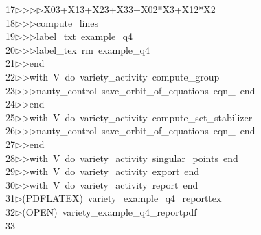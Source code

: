 \begin{tabbing}
17\>$\triangleright$\>$\triangleright$\>$\triangleright$\>$\triangleright$\>X03+X13+X23+X33+X02*X3+X12*X2\ \\[0pt]
18\>$\triangleright$\>$\triangleright$\>$\triangleright$\>compute\_lines\ \\[0pt]
19\>$\triangleright$\>$\triangleright$\>$\triangleright$\>label\_txt\ example\_q4\ \\[0pt]
20\>$\triangleright$\>$\triangleright$\>$\triangleright$\>label\_tex\ rm\ example\_q4\ \\[0pt]
21\>$\triangleright$\>$\triangleright$\>end\ \\[0pt]
22\>$\triangleright$\>$\triangleright$\>with\ V\ do\ variety\_activity\ compute\_group\ \\[0pt]
23\>$\triangleright$\>$\triangleright$\>$\triangleright$\>nauty\_control\ save\_orbit\_of\_equations\ eqn\_\ end\ \\[0pt]
24\>$\triangleright$\>$\triangleright$\>end\ \\[0pt]
25\>$\triangleright$\>$\triangleright$\>with\ V\ do\ variety\_activity\ compute\_set\_stabilizer\ \\[0pt]
26\>$\triangleright$\>$\triangleright$\>$\triangleright$\>nauty\_control\ save\_orbit\_of\_equations\ eqn\_\ end\ \\[0pt]
27\>$\triangleright$\>$\triangleright$\>end\ \\[0pt]
28\>$\triangleright$\>$\triangleright$\>with\ V\ do\ variety\_activity\ singular\_points\ end\ \\[0pt]
29\>$\triangleright$\>$\triangleright$\>with\ V\ do\ variety\_activity\ export\ end\ \\[0pt]
30\>$\triangleright$\>$\triangleright$\>with\ V\ do\ variety\_activity\ report\ end\\[0pt]
31\>$\triangleright$\>(PDFLATEX)\ variety\_example\_q4\_reporttex\\[0pt]
32\>$\triangleright$\>(OPEN)\ variety\_example\_q4\_reportpdf\\[0pt]
33\>\end{tabbing}

